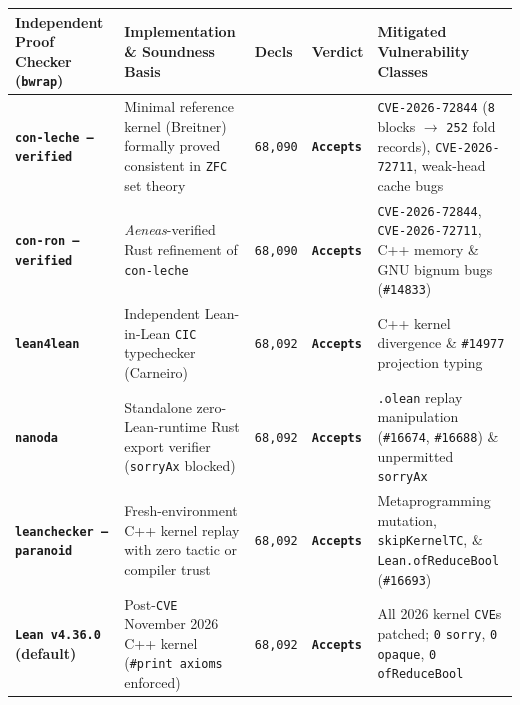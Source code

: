 \documentclass[10pt,letterpaper]{article}
\newcounter{none}
\begin{document}
{\def\LTcaptype{none} %
{\footnotesize\setlength{\tabcolsep}{3.8pt}\renewcommand{\arraystretch}{1.15}
\begin{longtable}[]{@{}
  >{\raggedright\arraybackslash}p{}
  >{\raggedright\arraybackslash}p{}
  >{\centering\arraybackslash}p{}
  >{\centering\arraybackslash}p{}
  >{\raggedright\arraybackslash}p{}@{}}
\toprule\noalign{}
\textbf{Independent Proof Checker (\texttt{bwrap})} &
\textbf{Implementation \& Soundness Basis} &
\textbf{Decls} &
\textbf{Verdict} &
\textbf{Mitigated Vulnerability Classes} \\
\midrule\noalign{}
\endhead
\bottomrule\noalign{}
\endlastfoot
\textbf{\texttt{con-leche\ --verified}} & Minimal reference kernel
(Breitner) formally proved consistent in \texttt{ZFC} set theory &
\texttt{68,090} & \textbf{\texttt{Accepts}} &
\texttt{CVE-2026-72844} (\texttt{8} blocks $\rightarrow$ \texttt{252} fold records), \texttt{CVE-2026-72711}, weak-head cache bugs \\
\textbf{\texttt{con-ron\ --verified}} & \emph{Aeneas}-verified Rust
refinement of \texttt{con-leche} & \texttt{68,090} &
\textbf{\texttt{Accepts}} & \texttt{CVE-2026-72844},
\texttt{CVE-2026-72711}, C++ memory \& GNU bignum bugs (\texttt{\#14833}) \\
\textbf{\texttt{lean4lean}} & Independent Lean-in-Lean \texttt{CIC}
typechecker (Carneiro) & \texttt{68,092} & \textbf{\texttt{Accepts}} &
C++ kernel divergence \& \texttt{\#14977} projection typing \\
\textbf{\texttt{nanoda}} & Standalone zero-Lean-runtime Rust export
verifier (\texttt{sorryAx} blocked) & \texttt{68,092} &
\textbf{\texttt{Accepts}} & \texttt{.olean} replay manipulation
(\texttt{\#16674}, \texttt{\#16688}) \& unpermitted \texttt{sorryAx} \\
\textbf{\texttt{leanchecker\ --paranoid}} & Fresh-environment C++ kernel
replay with zero tactic or compiler trust & \texttt{68,092} &
\textbf{\texttt{Accepts}} & Metaprogramming mutation,
\texttt{skipKernelTC}, \& \texttt{Lean.\allowbreak{}ofReduceBool} (\texttt{\#16693}) \\
\textbf{\texttt{Lean\ v4.36.0} (default)} & Post-\texttt{CVE} November
2026 C++ kernel (\texttt{\#print\ axioms} enforced) & \texttt{68,092} &
\textbf{\texttt{Accepts}} & All 2026 kernel \texttt{CVE}s patched;
\texttt{0} \texttt{sorry}, \texttt{0} \texttt{opaque}, \texttt{0} \texttt{ofReduceBool} \\
\end{longtable}
}
}
\end{document}

